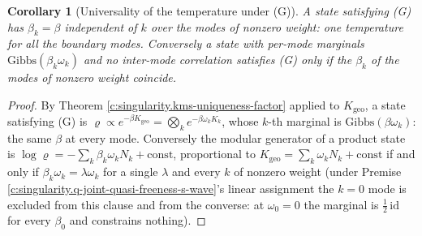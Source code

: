 \documentclass[11pt]{article}
\newtheorem{corollary}[theorem]{Corollary}
\theoremstyle{definition}
\theoremstyle{plain}
\begin{document}
\begin{corollary}[Universality of the temperature under (G)]\label{c:singularity.universality-temperature-under-g}
A state satisfying (G) has $\beta_k = \beta$ independent of $k$ over the modes of nonzero weight: one temperature for all the boundary modes. Conversely a state with per-mode marginals $\mathrm{Gibbs}(\beta_k\omega_k)$ and no inter-mode correlation satisfies (G) only if the $\beta_k$ of the modes of nonzero weight coincide.
\end{corollary}
\begin{proof}
By Theorem \ref{c:singularity.kms-uniqueness-factor} applied to $K_{\mathrm{geo}}$, a state satisfying (G) is $\varrho \propto e^{-\beta K_{\mathrm{geo}}} = \bigotimes_k e^{-\beta\omega_k K_k}$, whose $k$-th marginal is $\mathrm{Gibbs}(\beta\omega_k)$: the same $\beta$ at every mode. Conversely the modular generator of a product state is $\log\varrho = -\sum_k \beta_k\omega_k N_k + \mathrm{const}$, proportional to $K_{\mathrm{geo}} = \sum_k \omega_k N_k + \mathrm{const}$ if and only if $\beta_k\omega_k = \lambda\omega_k$ for a single $\lambda$ and every $k$ of nonzero weight (under Premise \ref{c:singularity.q-joint-quasi-freeness-s-wave}'s linear assignment the $k = 0$ mode is excluded from this clause and from the converse: at $\omega_0 = 0$ the marginal is $\tfrac12\,\mathrm{id}$ for every $\beta_0$ and constrains nothing).

\end{proof}
\end{document}
